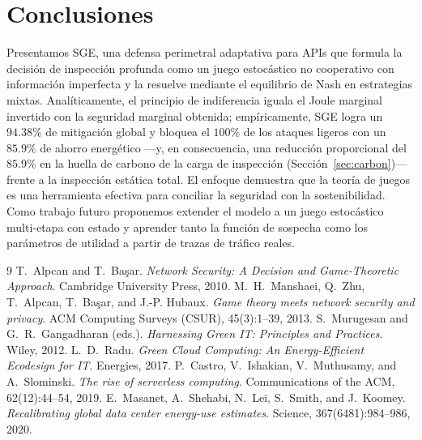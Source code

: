 \documentclass[10pt,twocolumn]{article}
\begin{document}
\section{Conclusiones}
\label{sec:conclusion}
Presentamos SGE, una defensa perimetral adaptativa para APIs que formula la decisi\'on
de inspecci\'on profunda como un juego estoc\'astico no cooperativo con informaci\'on
imperfecta y la resuelve mediante el equilibrio de Nash en estrategias mixtas.
Anal\'iticamente, el principio de indiferencia iguala el Joule marginal invertido con
la seguridad marginal obtenida; emp\'iricamente, SGE logra un $94.38\%$ de
mitigaci\'on global y bloquea el $100\%$ de los ataques ligeros con un $85.9\%$ de
ahorro energ\'etico ---y, en consecuencia, una reducci\'on proporcional del $85.9\%$
en la huella de carbono de la carga de inspecci\'on (Secci\'on~\ref{sec:carbon})---
frente a la inspecci\'on est\'atica total. El enfoque demuestra
que la teor\'ia de juegos es una herramienta efectiva para conciliar la seguridad con
la sostenibilidad. Como trabajo futuro proponemos extender el modelo a un juego
estoc\'astico multi-etapa con estado y aprender tanto la funci\'on de sospecha como
los par\'ametros de utilidad a partir de trazas de tr\'afico reales.

\begin{thebibliography}{9}
\small
{} T.~Alpcan and T.~Ba\c{s}ar. \emph{Network Security: A Decision and
Game-Theoretic Approach}. Cambridge University Press, 2010.
 M.~H.~Manshaei, Q.~Zhu, T.~Alpcan, T.~Ba\c{s}ar, and J.-P.
Hubaux. \emph{Game theory meets network security and privacy}. ACM Computing Surveys
(CSUR), 45(3):1--39, 2013.
 S.~Murugesan and G.~R.~Gangadharan (eds.). \emph{Harnessing Green
IT: Principles and Practices}. Wiley, 2012.
 L.~D.~Radu. \emph{Green Cloud Computing: An Energy-Efficient
Ecodesign for IT}. Energies, 2017.
 P.~Castro, V.~Ishakian, V.~Muthusamy, and A.~Slominski. \emph{The
rise of serverless computing}. Communications of the ACM, 62(12):44--54, 2019.
 E.~Masanet, A.~Shehabi, N.~Lei, S.~Smith, and J.~Koomey.
\emph{Recalibrating global data center energy-use estimates}. Science,
367(6481):984--986, 2020.
\end{thebibliography}
\end{document}
